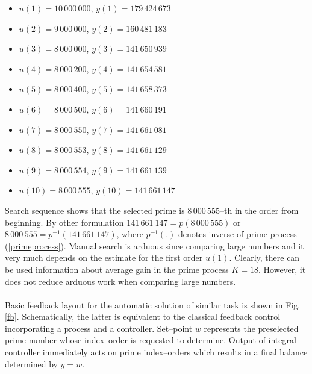 \documentclass[12pt,a4paper,twoside]{article}
\begin{document}
\begin{itemize}
\item $u(1)=10\,000\,000$, $y(1)=179\,424\,673$ 
\item $u(2)=9\,000\,000$, $y(2)=160\,481\,183$
\item $u(3)=8\,000\,000$, $y(3)=141\,650\,939$
\item $u(4)=8\,000\,200$, $y(4)=141\,654\,581$
\item $u(5)=8\,000\,400$, $y(5)=141\,658\,373$
\item $u(6)=8\,000\,500$, $y(6)=141\,660\,191$
\item $u(7)=8\,000\,550$, $y(7)=141\,661\,081$
\item $u(8)=8\,000\,553$, $y(8)=141\,661\,129$
\item $u(9)=8\,000\,554$, $y(9)=141\,661\,139$
\item $u(10)=8\,000\,555$, $y(10)=141\,661\,147$
\end{itemize}  
Search sequence shows that the selected prime is $ 8 \, 000 \,  555$--th in the order from beginning. By other formulation $ 141 \, 661 \ 147 = p (8 \, 000 \, 555) $ or $8 \, 000 \, 555  = p^{-1} (141 \, 661 \ 147) $, where $p^{-1}(.)$ denotes inverse of prime process (\ref{primeprocess}). Manual search is arduous since comparing large numbers and it very much depends on the estimate for the first order $u(1) $. Clearly, there can be used information about average gain in the prime process $ K = 18$. However, it does not reduce arduous work when comparing large numbers.\\
\\
Basic feedback layout for the automatic solution of similar task is shown in Fig. \ref{fb}.  Schematically, the latter is equivalent to the classical feedback control incorporating a process and a controller. Set--point $w$ represents the preselected prime number whose index--order is requested to determine. Output of integral controller immediately acts on prime index--orders which results in a final balance determined by $y = w$.
\end{document}
